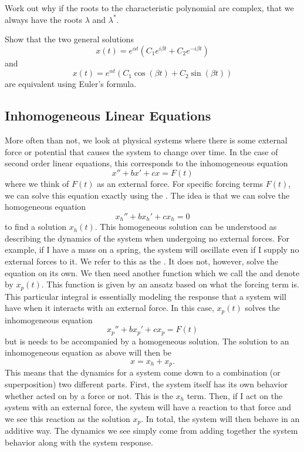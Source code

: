         \begin{exercise}
        Work out why if the roots to the characteristic polynomial are complex, that we always have the roots $\lambda$ and $\lambda^*$.
        \end{exercise}

        \begin{exercise}
        Show that the two general solutions
        \[
        x(t)=e^{\alpha t}(C_1 e^{i\beta t}+C_2e^{-i\beta t})
        \]
        and
        \[
        x(t)=e^{\alpha t}(C_1 \cos(\beta t)+C_2\sin(\beta t))
        \]
        are equivalent using Euler's formula.
        \end{exercise}

        \subsection{Inhomogeneous Linear Equations}

        More often than not, we look at physical systems where there is some external force or potential that causes the system to change over time.  In the case of second order linear equations, this corresponds to the inhomogeneous equation
        \[
        x''+bx'+cx=F(t)
        \]
        where we think of $F(t)$ as an external force.  For specific forcing terms $F(t)$, we can solve this equation exactly using the .  The idea is that we can solve the homogeneous equation
        \[
        x_h''+bx_h'+cx_h=0
        \]
        to find a solution $x_h(t)$.  This homogeneous solution can be understood as describing the dynamics of the system when undergoing no external forces. For example, if I have a mass on a spring, the system will oscillate even if I supply no external forces to it. We refer to this as the . It does not, however, solve the equation on its own. We then need another function which we call the  and denote by $x_p(t)$. This function is given by an ansatz based on what the forcing term is.  This particular integral is essentially modeling the response that a system will have when it interacts with an external force.  In this case, $x_p(t)$ solves the inhomogeneous equation
        \[
        x_p''+bx_p'+cx_p=F(t)
        \]
        but is needs to be accompanied by a homogeneous solution. The solution to an inhomogeneous equation as above will then be
        \[
        x=x_h+x_p.
        \]
        This means that the dynamics for a system come down to a combination (or superposition) two different parts.  First, the system itself has its own behavior whether acted on by a force or not.  This is the $x_h$ term.  Then, if I act on the system with an external force, the system will have a reaction to that force and we see this reaction as the solution $x_p$.  In total, the system will then behave in an additive way.  The dynamics we see simply come from adding together the system behavior along with the system response.

